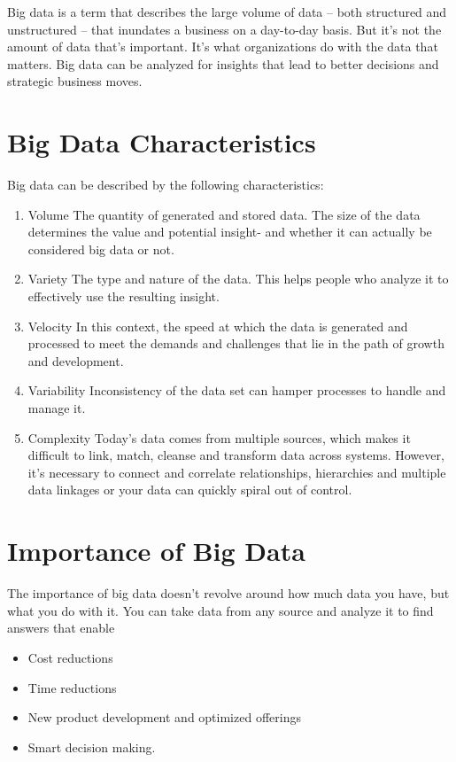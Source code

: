 Big data is a term that describes the large volume of data – both structured and unstructured – that inundates a business on a day-to-day basis. But it’s not the amount of data that’s important. It’s what organizations do with the data that matters. Big data can be analyzed for insights that lead to better decisions and strategic business moves.

\section{Big Data Characteristics}
Big data can be described by the following characteristics:
\begin{enumerate}
\item Volume
The quantity of generated and stored data. The size of the data determines the value and potential insight- and whether it can actually be considered big data or not.
\item Variety
The type and nature of the data. This helps people who analyze it to effectively use the resulting insight.
\item Velocity
In this context, the speed at which the data is generated and processed to meet the demands and challenges that lie in the path of growth and development.
\item Variability
Inconsistency of the data set can hamper processes to handle and manage it.
\item Complexity
Today's data comes from multiple sources, which makes it difficult to link, match, cleanse and transform data across systems. However, it’s necessary to connect and correlate relationships, hierarchies and multiple data linkages or your data can quickly spiral out of control.
\end{enumerate}

\section{Importance of Big Data}
The importance of big data doesn’t revolve around how much data you have, but what you do with it.
You can take data from any source and analyze it to find answers that enable
\begin{itemize}

\item Cost reductions
\item Time reductions
\item New product development and optimized offerings
\item Smart decision making.
\end{itemize}

